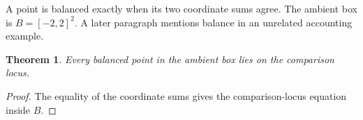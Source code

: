 \documentclass{article}
\newcommand{\shade}[1]{#1}
\newtheorem{theorem}{Theorem}
\begin{document}
A point is \shade{balanced} exactly when its two coordinate sums agree.
The ambient box is $B=[-2,2]^2$.
A later paragraph mentions balance in an unrelated accounting example.
\begin{theorem}\label{thm:balanced}
Every balanced point in the ambient box lies on the comparison locus.
\end{theorem}
\begin{proof}
The equality of the coordinate sums gives the comparison-locus equation inside $B$.
\end{proof}
\end{document}
